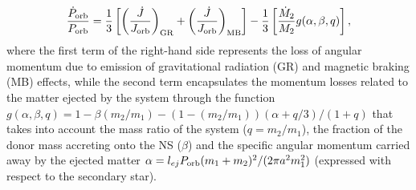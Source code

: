 \documentclass[fleqn,usenatbib]{mnras}
\begin{document}
\begin{equation}
\label{eq:evomom}
\frac{\dot{P}_{\rm orb}}{P_{\rm orb}}=\frac{1}{3}\left[\left( \frac{\dot{J}}{J_{\rm orb}} \right)_{\rm GR}+\left( \frac{\dot{J}}{J_{\rm orb}} \right)_{\rm MB}\right]-\frac{1}{3}\left[\frac{\dot{M}_2}{M_2} g(\alpha,\beta,q)\right],
\end{equation}
where the first term of the right-hand side represents the loss of angular momentum due to emission of gravitational radiation (GR) and magnetic braking (MB) effects, while the second term encapsulates the momentum losses related to the matter ejected by the system through the function $g(\alpha,\beta,q) = 1 - \beta (m_2/m_1) - (1 -(m_2/m_1))(\alpha + q/3)/(1 + q)$ that takes into account the mass ratio of the system ($q=m_2/m_1$), the fraction of the donor mass accreting onto the NS ($\beta$) and the specific angular momentum carried away by the ejected matter $\alpha = l_{ej}P_{\rm orb} (m_1 + m_2)^2/(2\pi a^2 m_1^2)$ (expressed with respect to the secondary star).  
\end{document}
